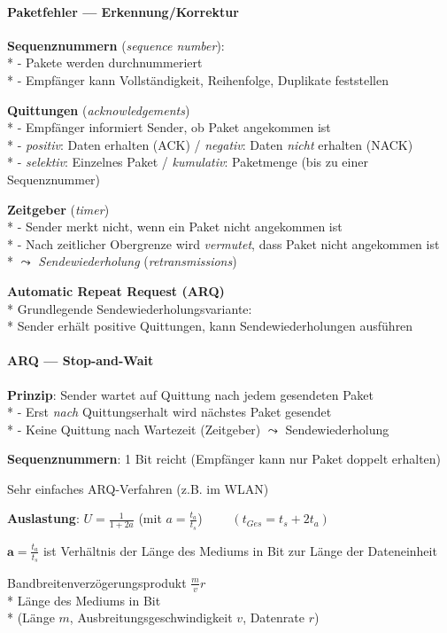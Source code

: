 \paragraph{Paketfehler --- Erkennung/Korrektur}
\begin{items}
  \item \textbf{Sequenznummern} (\emph{sequence number}): \\*
    	- Pakete werden durchnummeriert\\*
    	- Empfänger kann Vollständigkeit, Reihenfolge, Duplikate feststellen
  \item \textbf{Quittungen} (\emph{acknowledgements}) \\*
   - Empfänger informiert Sender, ob Paket angekommen ist \\*
   - \emph{positiv}: Daten erhalten (ACK) / \emph{negativ}: Daten \emph{nicht} erhalten (NACK) \\*
   - \emph{selektiv}: Einzelnes Paket / \emph{kumulativ}: Paketmenge (bis zu einer Sequenznummer)
  \item \textbf{Zeitgeber} (\emph{timer})\\*
    - Sender merkt nicht, wenn ein Paket nicht angekommen ist\\*
    - Nach zeitlicher Obergrenze wird \emph{vermutet}, dass Paket nicht angekommen ist \\* \( \leadsto \) \emph{Sendewiederholung} (\emph{retransmissions})
	\medskip
   \item \textbf{Automatic Repeat Request (ARQ)}\\*
   		Grundlegende Sendewiederholungsvariante:\\*
   		Sender erhält positive Quittungen, kann Sendewiederholungen ausführen
\end{items}

\paragraph{ARQ --- Stop-and-Wait}
\begin{items}
  \item \textbf{Prinzip}: Sender wartet auf Quittung nach jedem gesendeten Paket \\*
    - Erst \emph{nach} Quittungserhalt wird nächstes Paket gesendet \\*
    - Keine Quittung nach Wartezeit (Zeitgeber) \( \leadsto \) Sendewiederholung
  \item \textbf{Sequenznummern}: 1 Bit reicht (Empfänger kann nur Paket doppelt erhalten)
  \item Sehr einfaches ARQ-Verfahren (z.B. im WLAN)
  \medskip
  \item \textbf{Auslastung}: \( U = \tfrac{1}{1+2a} \) (mit \( a = \tfrac{t_a}{t_s} \)) $\qquad (t_{Ges} = t_s + 2t_a)$
  \medskip
  \item $\textbf{a} = \tfrac{t_a}{t_s}$ ist Verhältnis der Länge des Mediums in Bit zur Länge der Dateneinheit
  \item Bandbreitenverzögerungsprodukt \( \tfrac{m}{v}r \)\\*
  Länge des Mediums in Bit\\*
  (Länge \( m \), Ausbreitungsgeschwindigkeit \( v \), Datenrate \( r \))
\end{items}

